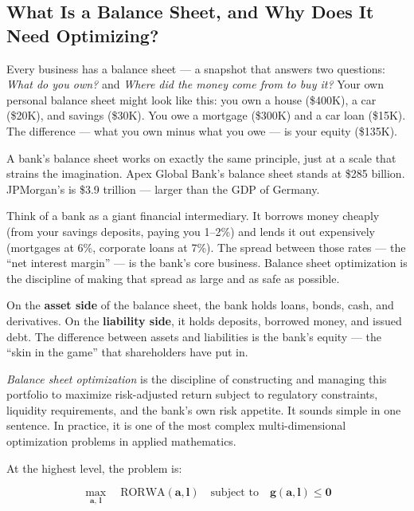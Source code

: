 \documentclass[12pt,a4paper]{article}
\begin{document}
\subsection{What Is a Balance Sheet, and Why Does It Need Optimizing?}

Every business has a balance sheet --- a snapshot that answers two questions:
\textit{What do you own?} and \textit{Where did the money come from to buy it?}
Your own personal balance sheet might look like this: you own a house (\$400K),
a car (\$20K), and savings (\$30K).  You owe a mortgage (\$300K) and a car loan
(\$15K).  The difference --- what you own minus what you owe --- is your equity
(\$135K).

A bank's balance sheet works on exactly the same principle, just at a scale that
strains the imagination.  Apex Global Bank's balance sheet stands at \$285
billion.  JPMorgan's is \$3.9 trillion --- larger than the GDP of Germany.

\begin{mdframed}[style=analogy]
Think of a bank as a giant financial intermediary.  It borrows money cheaply
(from your savings deposits, paying you 1--2\%) and lends it out expensively
(mortgages at 6\%, corporate loans at 7\%).  The spread between those rates ---
the ``net interest margin'' --- is the bank's core business.  Balance sheet
optimization is the discipline of making that spread as large and as safe as
possible.
\end{mdframed}

On the \textbf{asset side} of the balance sheet, the bank holds loans, bonds,
cash, and derivatives.  On the \textbf{liability side}, it holds deposits,
borrowed money, and issued debt.  The difference between assets and liabilities
is the bank's equity --- the ``skin in the game'' that shareholders have put in.

\emph{Balance sheet optimization} is the discipline of constructing and
managing this portfolio to maximize risk-adjusted return subject to regulatory
constraints, liquidity requirements, and the bank's own risk appetite.  It
sounds simple in one sentence.  In practice, it is one of the most complex
multi-dimensional optimization problems in applied mathematics.

At the highest level, the problem is:

\begin{equation}
  \max_{\mathbf{a},\,\mathbf{l}} \quad \text{RORWA}(\mathbf{a}, \mathbf{l})
  \quad \text{subject to} \quad
  \mathbf{g}(\mathbf{a}, \mathbf{l}) \leq \mathbf{0}
\end{equation}
\end{document}
